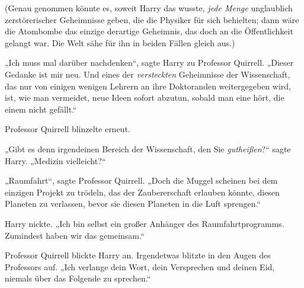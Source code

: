 (Genau genommen könnte es, soweit Harry das wusste, \emph{jede Menge} unglaublich zerstörerischer Geheimnisse geben, die die Physiker für sich behielten; dann wäre die Atombombe das einzige derartige Geheimnis, das doch an die Öffentlichkeit gelangt war. Die Welt sähe für ihn in beiden Fällen gleich aus.)

„Ich muss mal darüber nachdenken“, sagte Harry zu Professor Quirrell.
„Dieser Gedanke ist mir neu. Und eines der \emph{versteckten} Geheimnisse der Wissenschaft, das nur von einigen wenigen Lehrern an ihre Doktoranden weitergegeben wird, ist, wie man vermeidet, neue Ideen sofort abzutun, sobald man eine hört, die einem nicht gefällt.“

Professor Quirrell blinzelte erneut.

„Gibt es denn irgendeinen Bereich der Wissenschaft, den Sie \emph{gutheißen}?“ sagte Harry.
„Medizin vielleicht?“

„Raumfahrt“, sagte Professor Quirrell.
„Doch die Muggel scheinen bei dem einzigen Projekt zu trödeln, das der Zaubererschaft erlauben könnte, diesen Planeten zu verlassen, bevor sie diesen Planeten in die Luft sprengen.“

Harry nickte.
„Ich bin selbst ein großer Anhänger des Raumfahrtprogramms. Zumindest haben wir das gemeinsam.“

Professor Quirrell blickte Harry an. Irgendetwas blitzte in den Augen des Professors auf.
„Ich verlange dein Wort, dein Versprechen und deinen Eid, niemals über das Folgende zu sprechen.“

